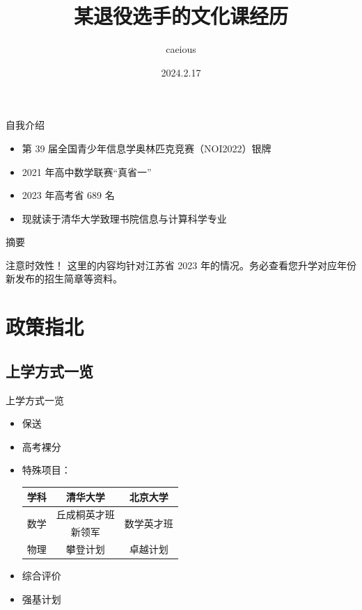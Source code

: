 \documentclass{beamer}
\title{某退役选手的文化课经历}
\author{caeious}
\date{2024.2.17}
\begin{document}
\begin{frame}
    \titlepage
\end{frame}

\begin{frame}{自我介绍}
\begin{itemize}
    \item 第 39 届全国青少年信息学奥林匹克竞赛（NOI2022）银牌
    \item 2021 年高中数学联赛“真省一”
    \item 2023 年高考省 689 名
    \item 现就读于清华大学致理书院信息与计算科学专业
\end{itemize}
\end{frame}

\begin{frame}{摘要}
    \tableofcontents[hideallsubsections]
    \begin{alertblock}{注意时效性！}
        这里的内容均针对江苏省 2023 年的情况。务必查看您升学对应年份新发布的招生简章等资料。
    \end{alertblock}
\end{frame}

\section{政策指北}

\subsection{上学方式一览}
\begin{frame}{上学方式一览}
    \begin{itemize}
        \pause
        \item 保送
        \pause
        \item 高考裸分
        \pause
        \item 特殊项目：
        \begin{table}[h!]
            \centering
            \begin{tabular}{|c|c|c|}
              \hline
              学科 & 清华大学 & 北京大学 \\
              \hline
              \multirow{2}{*}{数学} & 丘成桐英才班 & \multirow{2}{*}{数学英才班} \\
              \cline{2-2}
              & 新领军 &\\ 
              \hline
              物理 & 攀登计划 & 卓越计划\\
              \hline
            \end{tabular}
            \label{tab:special projects}
        \end{table}
        \pause
        \item 综合评价
        \pause
        \item 强基计划
    \end{itemize}
\end{frame}
\end{document}
